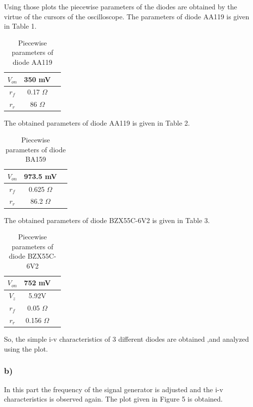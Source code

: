 \documentclass[letterpaper,12pt]{article}
\begin{document}
Using those plots the piecewise parameters of the diodes are obtained by the virtue of the cursors of the oscilloscope. The parameters of diode AA119 is given in Table 1.

\begin{table}[H]
    \begin{center}
    \caption{Piecewise parameters of diode AA119}
    \vspace{2mm}
    \begin{tabular}{|| c | c | c ||}
    \hline
    \(V_{on}\) & 350 mV \\
    \hline 
    \(r_f\) & 0.17 \(\Omega\) \\
    \hline
    \(r_r\) & 86 \(\Omega\)\\
    \hline
    \end{tabular}
\end{center}
\end{table}
The obtained parameters of diode AA119 is given in Table 2.
\begin{table}[H]
    \centering
    \caption{Piecewise parameters of diode BA159}
    \vspace{2mm}
    \begin{tabular}{||c | c | c||}
    \hline
    \(V_{on}\) & 973.5 mV \\
    \hline
    \(r_f\) & 0.625 \(\Omega\) \\
    \hline
    \(r_r\) & 86.2 \(\Omega\)\\
    \hline
    \end{tabular}
\end{table}
The obtained parameters of diode BZX55C-6V2 is given in Table 3.
\begin{table}[H]
    \centering
    \caption{Piecewise parameters of diode BZX55C-6V2}
    \vspace{2mm}
    \begin{tabular}{||c | c | c||}
        \hline
    \(V_{on}\) & 752 mV \\
    \hline
    \(V_{z}\) & 5.92V \\
    \hline
    \(r_f\) & 0.05 \(\Omega\) \\
    \hline
    \(r_r\) & 0.156 \(\Omega\) \\
    \hline
    \end{tabular}
\end{table}
So, the simple i-v characteristics of 3 different diodes are obtained ,and analyzed using the plot.

\subsubsection{b)}
In this part the frequency of the signal generator is adjusted and the i-v characteristics is observed again. The plot given in Figure 5 is obtained.
\end{document}
